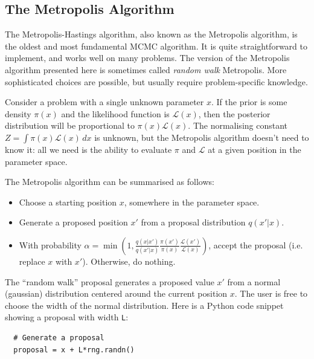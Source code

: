 \subsection{The Metropolis Algorithm}
The Metropolis-Hastings algorithm, also known as the Metropolis algorithm, is
the oldest and most fundamental MCMC algorithm.
It is quite straightforward to implement, and works well on many problems.
The version of the Metropolis algorithm presented here is sometimes called
{\it random walk} Metropolis. More sophisticated choices are possible,
but usually require problem-specific knowledge.

Consider a problem with a single unknown
parameter $x$. If the prior is some density $\pi(x)$ and the likelihood
function is $\mathcal{L}(x)$, then the posterior distribution will be
proportional to $\pi(x)\mathcal{L}(x)$. The normalising constant
$Z = \int \pi(x) \mathcal{L}(x) \, dx$ is unknown,
but the Metropolis algorithm doesn't need to know it: all we need is the
ability to evaluate $\pi$ and $\mathcal{L}$ at a given position in the parameter space.

The Metropolis algorithm can be summarised as follows:
\begin{itemize}
\item Choose a starting position $x$, somewhere in the parameter space.
\item Generate a proposed position $x'$ from a proposal distribution
$q(x'|x)$.
\item With probability
$\alpha=\min\left(1, \frac{q(x|x')}{q(x'|x)}\frac{\pi(x')}{\pi(x)}\frac{\mathcal{L}(x')}{\mathcal{L}(x)}\right)$, accept the proposal
(i.e. replace $x$ with $x'$). Otherwise, do nothing.
\end{itemize}

The ``random walk'' proposal generates a proposed value $x'$ from a normal
(gaussian) distribution centered around the current position $x$. The user
is free to choose the width of the normal distribution. Here is a Python code
snippet showing a proposal with width {\tt L}:

\begin{verbatim}
  # Generate a proposal
  proposal = x + L*rng.randn()
\end{verbatim}

